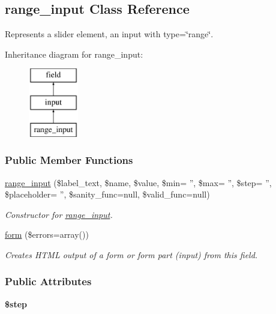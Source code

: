 \hypertarget{classrange__input}{\subsection{range\-\_\-input Class Reference}
\label{classrange__input}
}


Represents a slider element, an input with type=\char`\"{}range\char`\"{}.  


Inheritance diagram for range\-\_\-input\-:\begin{figure}[H]
\begin{center}
\leavevmode
\includegraphics[height=3.000000cm]{classrange__input}
\end{center}
\end{figure}
\subsubsection*{Public Member Functions}
\begin{DoxyCompactItemize}
\item 
\hyperlink{classrange__input_a6038a3b2b1499abb08ff6a10ac7a8e81}{range\-\_\-input} (\$label\-\_\-text, \$name, \$value, \$min= '', \$max= '', \$step= '', \$placeholder= '', \$sanity\-\_\-func=null, \$valid\-\_\-func=null)
\begin{DoxyCompactList}\small\item\em Constructor for \hyperlink{classrange__input}{range\-\_\-input}. \end{DoxyCompactList}\item 
\hyperlink{classrange__input_a84223d881e2c9279e6ca69c4957bf53e}{form} (\$errors=array())
\begin{DoxyCompactList}\small\item\em Creates H\-T\-M\-L output of a form or form part (input) from this field. \end{DoxyCompactList}\end{DoxyCompactItemize}
\subsubsection*{Public Attributes}
\begin{DoxyCompactItemize}
\item 
\hypertarget{classrange__input_ad5a0fe009154b6827fa0cb0ab2bec839}{{\bfseries \$step}}\label{classrange__input_ad5a0fe009154b6827fa0cb0ab2bec839}

\end{DoxyCompactItemize}


